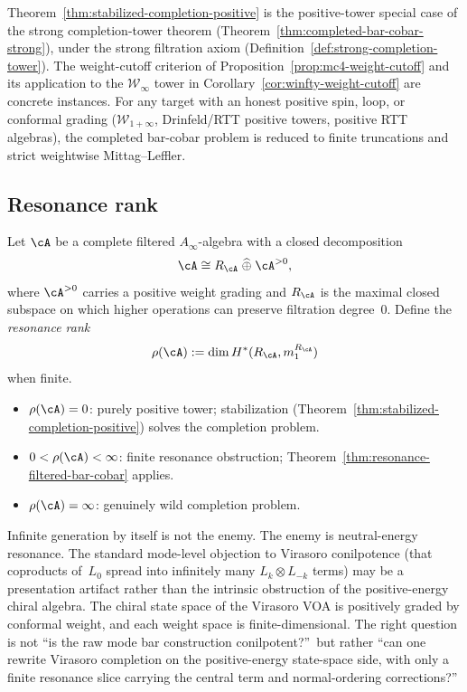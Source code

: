 \begin{remark}
\label{rem:stabilized-vs-mc4-criteria}
Theorem~\ref{thm:stabilized-completion-positive} is the
positive-tower special case of the strong completion-tower
theorem (Theorem~\ref{thm:completed-bar-cobar-strong}),
under the strong filtration axiom
(Definition~\ref{def:strong-completion-tower}).
The weight-cutoff criterion of
Proposition~\ref{prop:mc4-weight-cutoff} and its application to
the $\mathcal{W}_\infty$ tower in
Corollary~\ref{cor:winfty-weight-cutoff} are concrete instances.
For any target with an honest positive spin, loop, or conformal
grading \textup{(}$\mathcal{W}_{1+\infty}$, Drinfeld/RTT positive
towers, positive RTT algebras\textup{)}, the completed bar-cobar
problem is reduced to finite truncations and strict weightwise
Mittag--Leffler.
\end{remark}

\subsection{Resonance rank}

\begin{definition}
\label{def:resonance-rank}
Let $\cA$ be a complete filtered $A_\infty$-algebra with a closed
decomposition
\[
\cA \cong R_\cA \;\widehat{\oplus}\; \cA^{>0},
\]
where $\cA^{>0}$ carries a positive weight grading and $R_\cA$ is
the maximal closed subspace on which higher operations can preserve
filtration degree~$0$. Define the \emph{resonance rank}
\[
\rho(\cA) := \dim H^*(R_\cA, m_1^{R_\cA})
\]
when finite.
\begin{itemize}
\item $\rho(\cA) = 0$: purely positive tower;
 stabilization (Theorem~\ref{thm:stabilized-completion-positive})
 solves the completion problem.
\item $0 < \rho(\cA) < \infty$: finite resonance obstruction;
 Theorem~\ref{thm:resonance-filtered-bar-cobar} applies.
\item $\rho(\cA) = \infty$: genuinely wild completion problem.
\end{itemize}
\end{definition}

\begin{remark}
\label{rem:resonance-true-obstruction}
Infinite generation by itself is not the enemy.
The enemy is neutral-energy resonance. The standard
mode-level objection to Virasoro conilpotence (that
coproducts of~$L_0$ spread into infinitely many
$L_k \otimes L_{-k}$ terms) may be a presentation artifact
rather than the intrinsic obstruction of the positive-energy
chiral algebra. The chiral state space of the Virasoro VOA
is positively graded by conformal weight, and each weight space
is finite-dimensional. The right question is not ``is the raw
mode bar construction conilpotent?''\ but rather ``can one
rewrite Virasoro completion on the positive-energy state-space
side, with only a finite resonance slice carrying the
central term and normal-ordering corrections?''
\end{remark}

